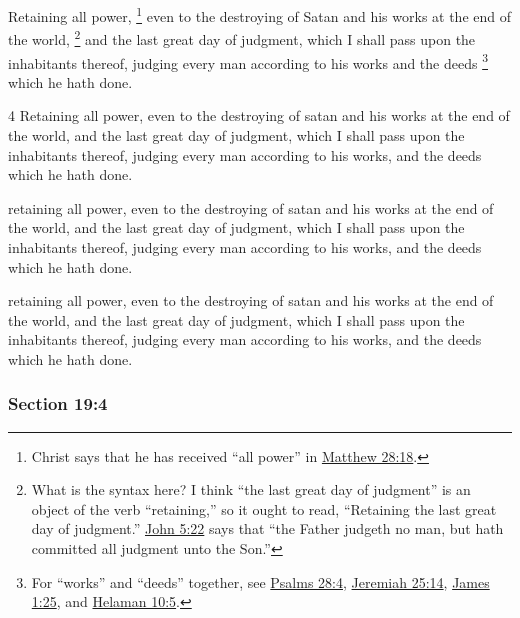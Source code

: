 		Retaining all power,%
			\footnote{%
				Christ says that he has received ``all power'' in \hyperref[MATTHEW-28-18]{Matthew 28:18}.
				}
		even to the destroying of Satan and his works at the end of the world,
			\footnote{%
				What is the syntax here? I think ``the last great day of judgment'' is an object of the verb ``retaining,'' so it ought to read, ``Retaining the last great day of judgment.'' \hyperref[JOHN-5-22]{John 5:22} says that ``the Father judgeth no man, but hath committed all judgment unto the Son.''
				}%
		and the last great day of judgment, which I shall pass upon the inhabitants thereof, judging every man according to his works and the deeds%
			\footnote{%
				For ``works'' and ``deeds'' together, see \hyperref[PSALMS-28-4]{Psalms 28:4}, \hyperref[JEREMIAH-25-14]{Jeremiah 25:14}, \hyperref[JAMES-1-25]{James 1:25}, and \hyperref[HELAMAN-10-5]{Helaman 10:5}.
				}
		which he hath done.

		\begin{framed}
		\scriptsize
			\begin{compactdesc}
				\item[JSP] 4 Retaining all power, even to the destroying of satan and his works at the end of the world, and the last great day of judgment, which I shall pass upon the inhabitants thereof, judging every man according to his works, and the deeds which he hath done.
				\item[RB1] [\textit{missing}]
				\item[DC 1835] retaining all power, even to the destroying of satan and his works at the end of the world, and the last great day of judgment, which I shall pass upon the inhabitants thereof, judging every man according to his works, and the deeds which he hath done. 
				\item[DC 1844] retaining all power, even to the destroying of satan and his works at the end of the world, and the last great day of judgment, which I shall pass upon the inhabitants thereof, judging every man according to his works, and the deeds which he hath done. 
			\end{compactdesc}
		\end{framed}

	\subsubsection{Section 19:4} %
		\label{DC19-4}


